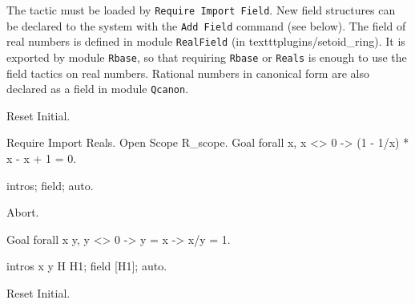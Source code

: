 The tactic must be loaded by \texttt{Require Import Field}. New field
structures can be declared to the system with the \texttt{Add Field}
command (see below). The field of real numbers is defined in module
\texttt{RealField} (in texttt{plugins/setoid\_ring}). It is exported
by module \texttt{Rbase}, so that requiring \texttt{Rbase} or
\texttt{Reals} is enough to use the field tactics on real
numbers. Rational numbers in canonical form are also declared as a
field in module \texttt{Qcanon}.


\Example
\begin{coq_eval}
Reset Initial.
\end{coq_eval}
\begin{coq_example}
Require Import Reals.
Open Scope R_scope.
Goal forall x,  x <> 0 ->
   (1 - 1/x) * x - x + 1 = 0.
\end{coq_example}
\begin{coq_example}
intros; field; auto.
\end{coq_example}
\begin{coq_eval}
Abort.
\end{coq_eval}
\begin{coq_example}
Goal forall x y, y <> 0 -> y = x -> x/y = 1.
\end{coq_example}
\begin{coq_example}
intros x y H H1; field [H1]; auto.
\end{coq_example} 
\begin{coq_eval}
Reset Initial.
\end{coq_eval}

